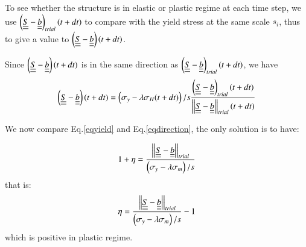 To see whether the structure is in elastic or plastic regime at each time step, we use $\left( \uline{\uline{S}}-\uline{\uline{b}}\right)_{trial}(t+dt)$ to compare with the yield stress at the same scale $s_i$, thus to give a value to $\left( \uline{\uline{S}}-\uline{\uline{b}}\right)(t+dt)$.

Since $\left( \uline{\uline{S}}-\uline{\uline{b}}\right)(t+dt)$ is in the same direction as $\left( \uline{\uline{S}}-\uline{\uline{b}}\right)_{trial}(t+dt)$, we have
\begin{equation}\left( \uline{\uline{S}}-\uline{\uline{b}}\right) (t+dt)= \left( \sigma_y-\lambda \sigma_H(t+dt)\right)/s\dfrac{\left( \uline{\uline{S}}-\uline{\uline{b}}\right)_{trial}(t+dt)}{\left| \left|\uline{\uline{S}}-\uline{\uline{b}}\right| \right|_{trial}(t+dt)}
\label{eqdirection}\end{equation}

We now compare Eq.\eqref{eqyield} and Eq.\eqref{eqdirection}, the only solution is to have:

\begin{equation}
1+\eta=\dfrac{\left| \left|\uline{\uline{S}}-\uline{\uline{b}}\right| \right|_{trial}}{\left( \sigma_y-\lambda \sigma_m\right)/s}
\end{equation}
that is:
\begin{equation}
\eta=\dfrac{\left| \left|\uline{\uline{S}}-\uline{\uline{b}}\right| \right|_{trial}}{\left( \sigma_y-\lambda \sigma_m\right)/s}-1
\label{eta2}
\end{equation}
which is positive in plastic regime.
